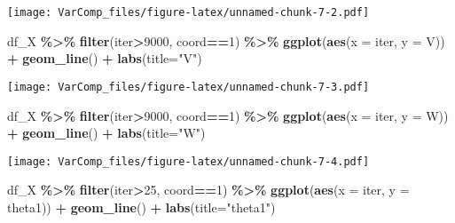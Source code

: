 \documentclass[
]{article}
\newenvironment{Shaded}{\begin{snugshade}}{\end{snugshade}}
\newcommand{\AttributeTok}[1]{\textcolor[rgb]{0.13,0.29,0.53}{#1}}
\newcommand{\DecValTok}[1]{\textcolor[rgb]{0.00,0.00,0.81}{#1}}
\newcommand{\FunctionTok}[1]{\textcolor[rgb]{0.13,0.29,0.53}{\textbf{#1}}}
\newcommand{\NormalTok}[1]{#1}
\newcommand{\SpecialCharTok}[1]{\textcolor[rgb]{0.81,0.36,0.00}{\textbf{#1}}}
\newcommand{\StringTok}[1]{\textcolor[rgb]{0.31,0.60,0.02}{#1}}
\begin{document}
\texttt{[image: VarComp\_files/figure-latex/unnamed-chunk-7-2.pdf]}

\begin{Shaded}
\begin{Highlighting}[]
\NormalTok{df\_X }\SpecialCharTok{\%\textgreater{}\%}
  \FunctionTok{filter}\NormalTok{(iter}\SpecialCharTok{\textgreater{}}\DecValTok{9000}\NormalTok{, coord}\SpecialCharTok{==}\DecValTok{1}\NormalTok{) }\SpecialCharTok{\%\textgreater{}\%} 
  \FunctionTok{ggplot}\NormalTok{(}\FunctionTok{aes}\NormalTok{(}\AttributeTok{x =}\NormalTok{ iter, }\AttributeTok{y =}\NormalTok{ V)) }\SpecialCharTok{+}
  \FunctionTok{geom\_line}\NormalTok{() }\SpecialCharTok{+} \FunctionTok{labs}\NormalTok{(}\AttributeTok{title=}\StringTok{"V"}\NormalTok{)}
\end{Highlighting}
\end{Shaded}

\texttt{[image: VarComp\_files/figure-latex/unnamed-chunk-7-3.pdf]}

\begin{Shaded}
\begin{Highlighting}[]
\NormalTok{df\_X }\SpecialCharTok{\%\textgreater{}\%}
  \FunctionTok{filter}\NormalTok{(iter}\SpecialCharTok{\textgreater{}}\DecValTok{9000}\NormalTok{, coord}\SpecialCharTok{==}\DecValTok{1}\NormalTok{) }\SpecialCharTok{\%\textgreater{}\%} 
  \FunctionTok{ggplot}\NormalTok{(}\FunctionTok{aes}\NormalTok{(}\AttributeTok{x =}\NormalTok{ iter, }\AttributeTok{y =}\NormalTok{ W)) }\SpecialCharTok{+}
  \FunctionTok{geom\_line}\NormalTok{() }\SpecialCharTok{+} \FunctionTok{labs}\NormalTok{(}\AttributeTok{title=}\StringTok{"W"}\NormalTok{)}
\end{Highlighting}
\end{Shaded}

\texttt{[image: VarComp\_files/figure-latex/unnamed-chunk-7-4.pdf]}

\begin{Shaded}
\begin{Highlighting}[]
\NormalTok{df\_X }\SpecialCharTok{\%\textgreater{}\%}
  \FunctionTok{filter}\NormalTok{(iter}\SpecialCharTok{\textgreater{}}\DecValTok{25}\NormalTok{, coord}\SpecialCharTok{==}\DecValTok{1}\NormalTok{) }\SpecialCharTok{\%\textgreater{}\%} 
  \FunctionTok{ggplot}\NormalTok{(}\FunctionTok{aes}\NormalTok{(}\AttributeTok{x =}\NormalTok{ iter, }\AttributeTok{y =}\NormalTok{ theta1)) }\SpecialCharTok{+}
  \FunctionTok{geom\_line}\NormalTok{() }\SpecialCharTok{+} \FunctionTok{labs}\NormalTok{(}\AttributeTok{title=}\StringTok{"theta1"}\NormalTok{)}
\end{Highlighting}
\end{Shaded}
\end{document}
